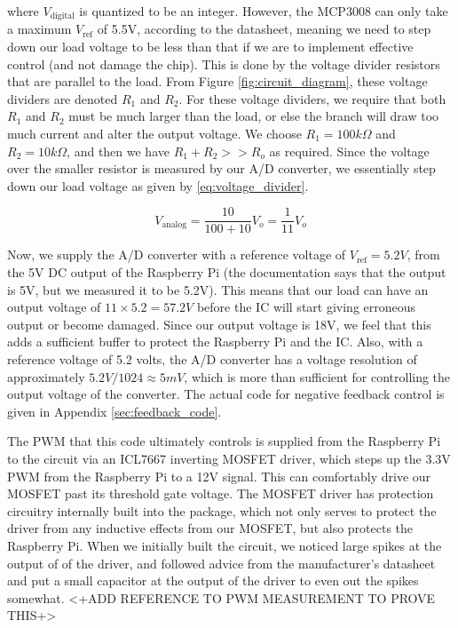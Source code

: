 \documentclass[a4paper, 12pt]{article}
\begin{document}
where $V_{\text{digital}}$ is quantized to be an integer. However, the MCP3008
can only take a maximum $V_{\text{ref}}$ of 5.5V, according to the datasheet,
meaning we need to step down our load voltage to be less than that if we are to
implement effective control (and not damage the chip). This is done by the
voltage divider resistors that are parallel to the load. From Figure
\ref{fig:circuit_diagram}, these voltage dividers are denoted $R_1$ and $R_2$.
For these voltage dividers, we require that both $R_1$ and $R_2$ must be much
larger than the load, or else the branch will draw too much current and alter
the output voltage. We choose $R_1 = 100k\Omega$ and $R_2 = 10k\Omega$, and
then we have $R_1 + R_2 >> R_o$ as required.  Since the voltage over the
smaller resistor is measured by our A/D converter, we essentially step down our
load voltage as given by \eqref{eq:voltage_divider}.

\begin{equation}
  V_{\text{analog}} = \frac{10}{100 + 10}V_o = \frac{1}{11} V_o
  \label{eq:voltage_divider}
\end{equation}

Now, we supply the A/D converter with a reference voltage of $V_{\text{ref}} =
5.2V$, from the 5V DC output of the Raspberry Pi (the documentation says that
the output is 5V, but we measured it to be 5.2V). This means that our load can
have an output voltage of $11 \times 5.2 = 57.2V$ before the IC will start
giving erroneous output or become damaged. Since our output voltage is 18V, we
feel that this adds a sufficient buffer to protect the Raspberry Pi and the IC.
Also, with a reference voltage of 5.2 volts, the A/D converter has a voltage
resolution of approximately $5.2V / 1024 \approx 5mV$, which is more than
sufficient for controlling the output voltage of the converter. The actual code
for negative feedback control is given in Appendix \ref{sec:feedback_code}.

The PWM that this code ultimately controls is supplied from the Raspberry Pi to
the circuit via an ICL7667 inverting MOSFET driver, which steps up the 3.3V PWM
from the Raspberry Pi to a 12V signal. This can comfortably drive our MOSFET
past its threshold gate voltage. The MOSFET driver has protection circuitry
internally built into the package, which not only serves to protect the driver
from any inductive effects from our MOSFET, but also protects the Raspberry Pi.
When we initially built the circuit, we noticed large spikes at the output of
of the driver, and followed advice from the manufacturer's datasheet and put a
small capacitor at the output of the driver to even out the spikes somewhat.
<+ADD REFERENCE TO PWM MEASUREMENT TO PROVE THIS+>
\end{document}
